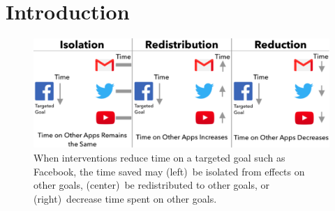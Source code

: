 \section{Introduction}








\begin{figure}

\includegraphics[width=\linewidth, clip,trim=0 0 0.1 0]{figures2/intro/fig1v4.pdf}
\caption{When interventions reduce time on a targeted goal such as Facebook, the time saved may (left)~be isolated from effects on other goals, (center)~be redistributed to other goals, or (right)~decrease time spent on other goals.
} %

  \label{fig:hypotheses-within}
\end{figure}

